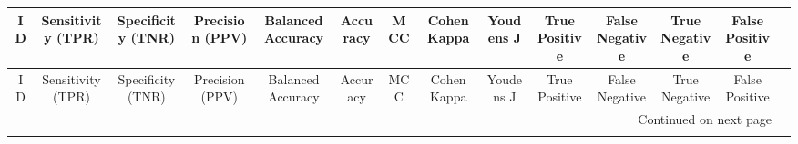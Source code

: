 \documentclass[8pt]{article}
\begin{document}
\begin{center}
\begin{footnotesize}
\begin{longtable}{|cccccccccccccc|}
\toprule
ID & Sensitivity (TPR) & Specificity (TNR) &   Precision (PPV) & Balanced Accuracy &          Accuracy &                 MCC &         Cohen Kappa &           Youdens J &           True Positive &             False Negative &                 True Negative &             False Positive \\
\midrule
\endfirsthead

\toprule
ID & Sensitivity (TPR) & Specificity (TNR) &   Precision (PPV) & Balanced Accuracy &          Accuracy &                 MCC &         Cohen Kappa &           Youdens J &           True Positive &             False Negative &                 True Negative &             False Positive \\
\midrule
\endhead
\midrule
\multicolumn{13}{r}{{Continued on next page}} \\
\midrule
\endfoot


\end{longtable}
\end{footnotesize}
\end{center}
\end{document}
